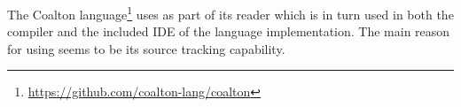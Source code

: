 The Coalton
language\footnote{\url{https://github.com/coalton-lang/coalton}} uses
\eclector{} as part of its reader which is in turn used in both the
compiler and the included IDE of the language implementation.  The
main reason for using \eclector{} seems to be its source tracking
capability.




